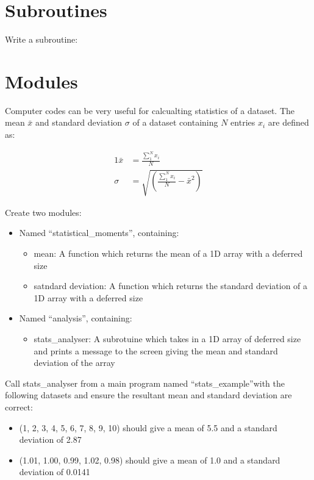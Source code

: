 \documentclass[11pt,a4paper]{article}
\begin{document}
\section{Subroutines}
Write a subroutine:



\section{Modules}
Computer codes can be very useful for calcualting statistics of a dataset. The mean $\bar{x}$ and standard deviation $\sigma$ of a dataset containing $N$ entries $x_{i}$ are defined as:

\begin{alignat}{1}
    \bar{x} & = \frac{\sum\limits_{1}^{N} x_{i}}{N} \\
    \sigma &= \sqrt{\left(\frac{\sum\limits_{1}^{N} x_{i}}{N}-\bar{x}^{2}\right)}
\end{alignat}

Create two modules:
\begin{itemize}
    \item Named ``statistical\_moments'', containing:
    \begin{itemize}
        \item mean: A function which returns the mean of a 1D array with a deferred size
        \item satndard deviation: A function which returns the standard deviation of a 1D array with a deferred size
    \end{itemize}
    \item Named ``analysis'', containing:
    \begin{itemize}
        \item stats\_analyser: A subrotuine which takes in a 1D array of deferred size and prints a message to the screen giving the mean and standard deviation of the array
    \end{itemize}
\end{itemize}

Call stats\_analyser from a main program named ``stats\_example''with the following datasets and ensure the resultant mean and standard deviation are correct:
\begin{itemize}
    \item (1, 2, 3, 4, 5, 6, 7, 8, 9, 10) should give a mean of 5.5 and a standard deviation of 2.87
    \item (1.01, 1.00, 0.99, 1.02, 0.98) should give a mean of 1.0 and a standard deviation of  0.0141
\end{itemize}
\end{document}
